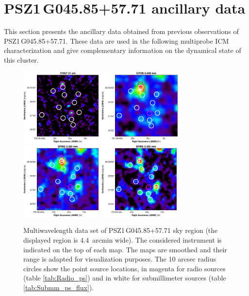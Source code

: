 \documentclass[traditabstract]{aa}
\begin{document}
\section{\mbox{PSZ1\,G045.85+57.71} ancillary data}\label{sec:Previous}

This section presents the ancillary data obtained from previous observations of \mbox{PSZ1\,G045.85+57.71}. These data are used in the following multiprobe ICM characterization and give complementary information on the dynamical state of this cluster.
\begin{figure}[t]
\centering
\includegraphics[height=3.9cm]{First_def2.pdf}
\hspace{0.4cm}
\includegraphics[height=3.9cm]{Herschel_500mic2.pdf}
\hspace{0.4cm}
\includegraphics[height=3.9cm]{Herschel_350mic2.pdf}
\hspace{0.4cm}
\includegraphics[height=3.9cm]{Herschel_250mic2.pdf}
\caption{{\footnotesize Multiwavelength data set of \mbox{PSZ1\,G045.85+57.71} sky region (the displayed region is 4.4~arcmin wide). The considered instrument is indicated on the top of each map. The maps are smoothed and their range is adapted for visualization purposes. The 10 arcsec radius circles show the point source locations,  in magenta for radio sources (table \ref{tab:Radio_ps}) and in white for submillimeter sources (table \ref{tab:Submm_ps_flux}).}}
\label{fig:point_sources}
\end{figure}
\end{document}
